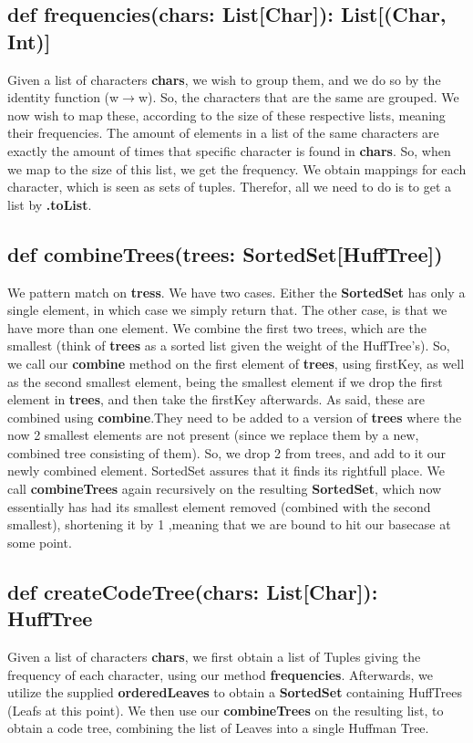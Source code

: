 \documentclass{article}
\begin{document}
\subsection{def frequencies(chars: List[Char]): List[(Char, Int)]}
Given a list of characters \textbf{chars}, we wish to group them, and we do so by the identity function (w$\rightarrow$w). So, the characters that are the same are grouped. We now wish to map these, according to the size of these respective lists, meaning their frequencies. The amount of elements in a list of the same characters are exactly the amount of times that specific character is found in \textbf{chars}. So, when we map to the size of this list, we get the frequency. We obtain mappings for each character, which is seen as sets of tuples. Therefor, all we need to do is to get a list by \textbf{.toList}.

\subsection{def combineTrees(trees: SortedSet[HuffTree])}
We pattern match on \textbf{tress}. We have two cases. Either the  \textbf{SortedSet} has only a single element, in which case we simply return that. The other case, is that we have more than one element. We combine the first two trees, which are the smallest (think of \textbf{trees} as a sorted list given the weight of the HuffTree's). So, we call our \textbf{combine} method on the first element of \textbf{trees}, using firstKey, as well as the second smallest element, being the smallest element if we drop the first element in \textbf{trees}, and then take the firstKey afterwards. As said, these are combined using \textbf{combine}.They need to be added to a version of \textbf{trees} where the now 2 smallest elements are not present (since we replace them by a new, combined tree consisting of them). So, we drop 2 from trees, and add to it our newly combined element. SortedSet assures that it finds its rightfull place. We call \textbf{combineTrees} again recursively on the resulting \textbf{SortedSet}, which now essentially has had its smallest element removed (combined with the second smallest), shortening it by 1 ,meaning that we are bound to hit our basecase at some point. 

\subsection{def createCodeTree(chars: List[Char]): HuffTree}
Given a list of characters \textbf{chars}, we first obtain a list of Tuples giving the frequency of each character, using our method \textbf{frequencies}. Afterwards, we utilize the supplied \textbf{orderedLeaves} to obtain a \textbf{SortedSet} containing HuffTrees (Leafs at this point). We then use our \textbf{combineTrees} on the resulting list, to obtain a code tree, combining the list of Leaves into a single Huffman Tree.

\end{document}
